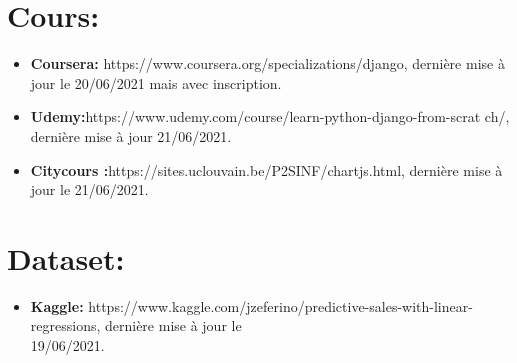 \documentclass[a4paper]{report}
\begin{document}
\section{Cours:}
\begin{itemize}
	\item \textbf{Coursera:}
	      https://www.coursera.org/specializations/django, dernière mise à jour le
	      20/06/2021 mais avec inscription.
	      
	      \item\textbf{Udemy:}https://www.udemy.com/course/learn-python-django-from-scrat
	      ch/, dernière mise à jour 21/06/2021.
	\item \textbf{Citycours
	:}https://sites.uclouvain.be/P2SINF/chartjs.html, dernière mise à jour le
	21/06/2021.
\end{itemize}
\section{Dataset:}
\begin{itemize}
	\item \textbf{Kaggle:}
	      https://www.kaggle.com/jzeferino/predictive-sales-with-linear-regressions,
	      dernière mise à jour le\\ 19/06/2021.
\end{itemize}
\end{document}
